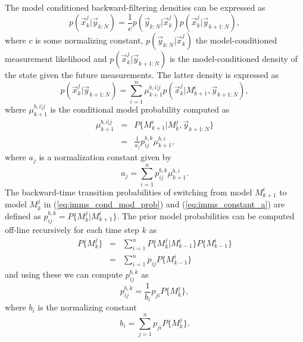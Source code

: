 The model conditioned backward-filtering densities can be expressed as
%
\begin{equation}
%
p(\vec{x}_k^j|\vec{y}_{k:N}) = \frac{1}{c}
p(\vec{y}_{k:N}|\vec{x}_k^j) p(\vec{x}_k^j|\vec{y}_{k+1:N}),
%
\end{equation}
%
where $c$ is some normalizing constant, $p(\vec{y}_{k:N}|\vec{x}_k^j)$
the model-conditioned measurement likelihood and
$p(\vec{x}_k^j|\vec{y}_{k+1:N})$ is the model-conditioned density of
the state given the future measurements.  The latter density is
expressed as
%
\begin{equation}
%
p(\vec{x}_k^j|\vec{y}_{k+1:N}) = \sum_{i=1}^n \mu_{k+1}^{b,i|j}
p(\vec{x}_k^j|M_{k+1}^i,\vec{y}_{k+1:N}),
\label{eq:imm_back_modelc_predict}
%
\end{equation}
%
where $\mu_{k+1}^{b,i|j}$ is the conditional model probability
computed as
%
\begin{eqnarray}
%
\mu_{k+1}^{b,i|j} & = & P\{M_{k+1}^i|M_k^j,\vec{y}_{k+1:N} \} \\
\label{eq:imms_cond_mod_prob} & = & \frac{1}{a_j} p_{ij}^{b,k}
\mu_{k+1}^{b,i},
%
\end{eqnarray}
%
where $a_j$ is a normalization constant given by
%
\begin{equation}
%
a_j = \sum_{i=1}^{n} p_{ij}^{b,k}
\mu_{k+1}^{b,i}. \label{eq:imms_constant_a}
%
\end{equation}
%
The backward-time transition probabilities of switching from model
$M_{k+1}^i$ to model $M_k^j$ in (\ref{eq:imms_cond_mod_prob}) and
(\ref{eq:imms_constant_a}) are defined as $p_{ij}^{b,k} =
P\{M_k^j|M_{k+1}^i\}$. The prior model probabilities can be computed
off-line recursively for each time step $k$ as
%
\begin{eqnarray}
%
P\{M_k^j\} & = & \sum_{i=1}^n P\{M_k^j|M_{k-1}^i\} P\{M_{k-1}^i\} \\ &
= & \sum_{i=1}^n p_{ij} P\{M_{k-1}^i\}
%
\end{eqnarray}
%
and using these we can compute $p_{ij}^{b,k}$ as
%
\begin{equation}
%
p_{ij}^{b,k} = \frac{1}{b_i} p_{ji} P\{M_{k}^j\},
%
\end{equation}
%
where $b_i$ is the normalizing constant
%
\begin{equation}
%
b_i = \sum_{j=1}^n p_{ji} P \{ M_k^j\}.
%
\end{equation}
%

